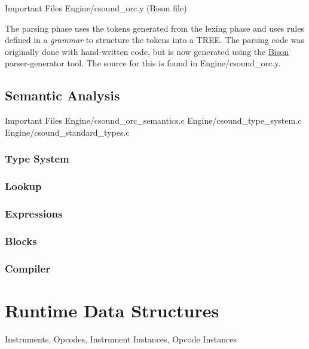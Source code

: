 \documentclass[]{book}
\begin{document}
\begin{bclogo}[couleur=blue!30,arrondi=0.1,ombre=true,logo=\bcetoile]
{Important Files}
Engine/csound\_orc.y (Bison file)
\end{bclogo}

The parsing phase uses the tokens generated from the lexing phase and
uses rules defined in a \emph{grammar} to structure the tokens into a
TREE. The parsing code was originally done with hand-written code, but
is now generated using the
\href{http://www.gnu.org/software/bison/}{Bison} parser-generator tool.
The source for this is found in Engine/csound\_orc.y.


\subsection{Semantic Analysis}

\begin{bclogo}[couleur=blue!30,arrondi=0.1,ombre=true,logo=\bcetoile]
{Important Files}
Engine/csound\_orc\_semantics.c 
Engine/csound\_type\_system.c 
Engine/csound\_standard\_types.c 
\end{bclogo}

\subsubsection{Type System}

\subsubsection{Lookup}

\subsubsection{Expressions}

\subsubsection{Blocks}

\subsubsection{Compiler}

\section{Runtime Data Structures}

Instruments, Opcodes, Instrument Instances, Opcode Instances
\end{document}
